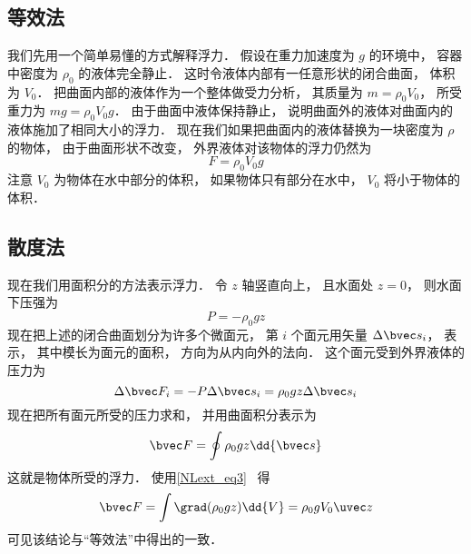
\subsection{等效法}

我们先用一个简单易懂的方式解释浮力． 假设在重力加速度为 $g$ 的环境中， 容器中密度为 $\rho_0$ 的液体完全静止． 这时令液体内部有一任意形状的闭合曲面， 体积为 $V_0$． 把曲面内部的液体作为一个整体做受力分析， 其质量为 $m = \rho_0 V_0$， 所受重力为 $mg = \rho_0 V_0 g$． 由于曲面中液体保持静止， 说明曲面外的液体对曲面内的液体施加了相同大小的浮力． 现在我们如果把曲面内的液体替换为一块密度为 $\rho$ 的物体， 由于曲面形状不改变， 外界液体对该物体的浮力仍然为
\begin{equation}
F = \rho_0 V_0 g
\end{equation}
注意 $V_0$ 为物体在水中部分的体积， 如果物体只有部分在水中， $V_0$ 将小于物体的体积．

\subsection{散度法}

现在我们用面积分的方法表示浮力． 令 $z$ 轴竖直向上， 且水面处 $z = 0$， 则水面下压强为
\begin{equation}
P = -\rho_0 g z
\end{equation}
现在把上述的闭合曲面划分为许多个微面元， 第 $i$ 个面元用矢量 $\Delta \bvec s_i$， 表示， 其中模长为面元的面积， 方向为从内向外的法向． 这个面元受到外界液体的压力为
\begin{equation}
\Delta \bvec F_i = -P\Delta \bvec s_i = \rho_0 g z \Delta \bvec s_i
\end{equation}
现在把所有面元所受的压力求和， 并用曲面积分表示为
\begin{equation}
\bvec F = \oint \rho_0 g z \dd{\bvec s}
\end{equation}
这就是物体所受的浮力． 使用\autoref{NLext_eq3}~ 得
\begin{equation}
\bvec F = \int \grad(\rho_0 g z) \dd{V} = \rho_0 g V_0 \uvec z
\end{equation}
可见该结论与“等效法”中得出的一致．
